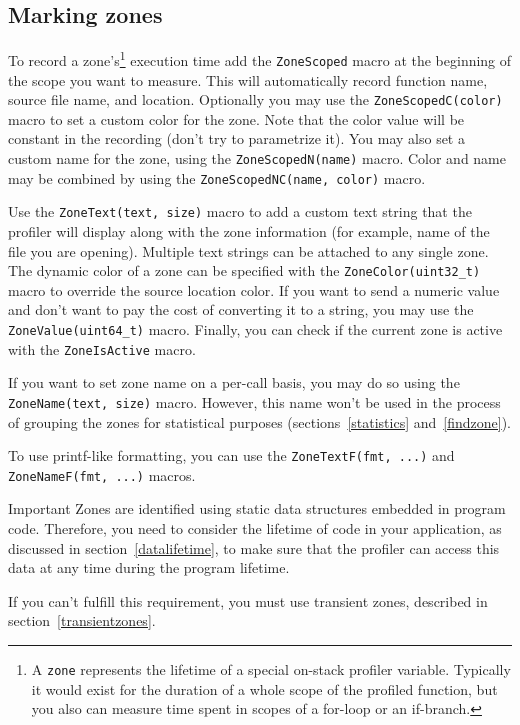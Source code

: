 \documentclass[hidelinks,titlepage,a4paper,twoside]{article}
\begin{document}
\subsection{Marking zones}
\label{markingzones}

To record a zone's\footnote{A \texttt{zone} represents the lifetime of a special on-stack profiler variable. Typically it would exist for the duration of a whole scope of the profiled function, but you also can measure time spent in scopes of a for-loop or an if-branch.} execution time add the \texttt{ZoneScoped} macro at the beginning of the scope you want to measure. This will automatically record function name, source file name, and location. Optionally you may use the \texttt{ZoneScopedC(color)} macro to set a custom color for the zone. Note that the color value will be constant in the recording (don't try to parametrize it). You may also set a custom name for the zone, using the \texttt{ZoneScopedN(name)} macro. Color and name may be combined by using the \texttt{ZoneScopedNC(name, color)} macro.

Use the \texttt{ZoneText(text, size)} macro to add a custom text string that the profiler will display along with the zone information (for example, name of the file you are opening). Multiple text strings can be attached to any single zone. The dynamic color of a zone can be specified with the \texttt{ZoneColor(uint32\_t)} macro to override the source location color. If you want to send a numeric value and don't want to pay the cost of converting it to a string, you may use the \texttt{ZoneValue(uint64\_t)} macro. Finally, you can check if the current zone is active with the \texttt{ZoneIsActive} macro.

If you want to set zone name on a per-call basis, you may do so using the \texttt{ZoneName(text, size)} macro. However, this name won't be used in the process of grouping the zones for statistical purposes (sections~\ref{statistics} and~\ref{findzone}).

To use printf-like formatting, you can use the \texttt{ZoneTextF(fmt, ...)} and \texttt{ZoneNameF(fmt, ...)} macros.

\begin{bclogo}[
noborder=true,
couleur=black!5,
logo=\bcbombe
]{Important}
Zones are identified using static data structures embedded in program code. Therefore, you need to consider the lifetime of code in your application, as discussed in section~\ref{datalifetime}, to make sure that the profiler can access this data at any time during the program lifetime.

If you can't fulfill this requirement, you must use transient zones, described in section~\ref{transientzones}.
\end{bclogo}
\end{document}
